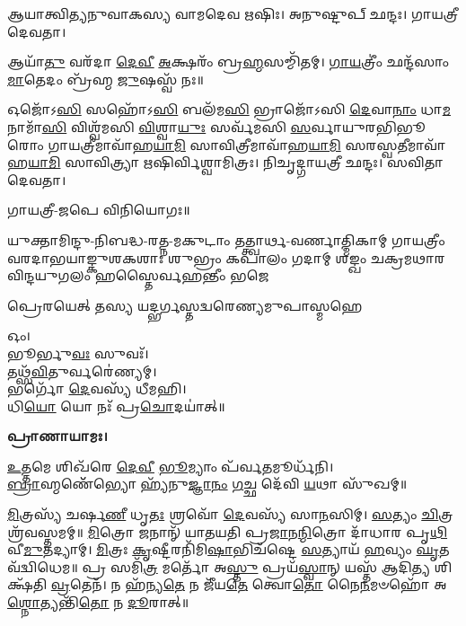𑌆𑌯𑌾𑌤𑍍𑌵𑌿𑌤𑍍𑌯𑌨𑍁𑌵𑌾𑌕𑌸𑍍𑌯 𑌵𑌾𑌮𑌦𑍇𑌵 𑌋𑌷𑌿𑌃।
𑌅𑌨𑍁𑌷𑍍𑌟𑍁𑌪𑍍 𑌛𑌨𑍍𑌦𑌃।
𑌗𑌾𑌯𑌤𑍍𑌰𑍀 𑌦𑍇𑌵𑌤𑌾।

𑌆𑌯𑌾᳴\-\ul{𑌤𑍁} 𑌵𑌰᳴𑌦𑌾 \ul{𑌦𑍇}\-\-\ul{𑌵𑍀} \ul{𑌅}\-𑌕𑍍𑌷𑌰𑌂᳴ 𑌬𑍍𑌰\-\ul{𑌹𑍍𑌮}\-𑌸𑌮𑍍𑌮𑌿᳴𑌤𑌮𑍍। \ul{𑌗𑌾}\-\-\ul{𑌯}\-𑌤𑍍𑌰𑍀𑌂॑ 𑌛𑌨𑍍𑌦᳴𑌸𑌾𑌂 \ul{𑌮𑌾}\-𑌤𑍇𑌦𑌂 𑌬𑍍𑌰᳴𑌹𑍍𑌮 \ul{𑌜𑍁}\-𑌷𑌸𑍍𑌵᳴ 𑌨𑌃॥

𑌓𑌜𑍋᳴𑌽\-\ul{𑌸𑌿} 𑌸𑌹𑍋᳴𑌽\-\ul{𑌸𑌿} 𑌬𑌲᳴𑌮\-\ul{𑌸𑌿} 𑌭𑍍𑌰𑌾𑌜𑍋᳴𑌽𑌸𑌿 \ul{𑌦𑍇}\-𑌵𑌾\-\ul{𑌨𑌾𑌂} 𑌧𑌾\-\ul{𑌮} 𑌨𑌾𑌮𑌾᳴\-\ul{𑌸𑌿} 𑌵𑌿𑌶𑍍𑌵᳴𑌮𑌸𑌿 \ul{𑌵𑌿}\-𑌶𑍍𑌵𑌾\-\ul{𑌯𑍁𑌃} 𑌸𑌰𑍍𑌵᳴𑌮𑌸𑌿 \ul{𑌸}\-𑌰𑍍𑌵𑌾𑌯𑍁𑌰𑌭𑌿𑌭𑍂𑌰𑍋𑌂 𑌗𑌾𑌯𑌤𑍍𑌰𑍀𑌮𑌾𑌵𑌾᳴𑌹\-\ul{𑌯𑌾}\-\-\ul{𑌮𑌿} 𑌸𑌾𑌵𑌿𑌤𑍍𑌰𑍀𑌮𑌾𑌵𑌾᳴𑌹\-\ul{𑌯𑌾}\-\-\ul{𑌮𑌿} 𑌸𑌰𑌸𑍍𑌵𑌤𑍀𑌮𑌾𑌵𑌾᳴𑌹\-\-\ul{𑌯𑌾}\-\-\ul{𑌮𑌿} 𑌸𑌾𑌵𑌿𑌤𑍍𑌰𑍍𑌯𑌾 𑌋𑌷𑌿𑌰𑍍𑌵𑌿𑌶𑍍𑌵𑌾𑌮𑌿𑌤𑍍𑌰𑌃। 𑌨𑌿𑌚𑍃𑌦𑍍𑌗𑌾𑌯𑌤𑍍𑌰𑍀 𑌛𑌨𑍍𑌦𑌃। 𑌸𑌵𑌿𑌤𑌾 𑌦𑍇𑌵𑌤𑌾।

𑌗𑌾𑌯𑌤𑍍𑌰𑍀-𑌜𑌪𑍇 𑌵𑌿𑌨𑌿𑌯𑍋𑌗𑌃॥



{𑌯𑍁𑌕𑍍𑌤𑌾𑌮𑌿𑌨𑍍𑌦𑍁-𑌨𑌿𑌬𑌦𑍍𑌧-𑌰𑌤𑍍𑌨-𑌮𑌕𑍁𑌟𑌾𑌂 𑌤𑌤𑍍𑌤𑍍𑌵𑌾𑌰𑍍𑌥-𑌵𑌰𑍍𑌣𑌾𑌤𑍍𑌮𑌿𑌕𑌾𑌮𑍍}
{𑌗𑌾𑌯𑌤𑍍𑌰𑍀𑌂 𑌵𑌰𑌦𑌾𑌭𑌯𑌾𑌙𑍍𑌕𑍁𑌶𑌕𑌶𑌾𑌃 𑌶𑍁𑌭𑍍𑌰𑌂 𑌕𑌪𑌾𑌲𑌂 𑌗𑌦𑌾𑌮𑍍}
{𑌶𑌙𑍍𑌖𑌂 𑌚𑌕𑍍𑌰𑌮𑌥𑌾𑌰𑌵𑌿𑌨𑍍𑌦𑌯𑍁𑌗𑌲𑌂 𑌹𑌸𑍍𑌤𑍈𑌰𑍍𑌵𑌹𑌨𑍍𑌤𑍀𑌂 𑌭𑌜𑍇}

{𑌪𑍍𑌰𑍇𑌰𑌯𑍇𑌤𑍍 𑌤𑌸𑍍𑌯 𑌯𑌦𑍍𑌭𑌰𑍍𑌗𑌸𑍍𑌤𑌦𑍍𑌵𑌰𑍇𑌣𑍍𑌯𑌮𑍁𑌪𑌾𑌸𑍍𑌮𑌹𑍇}


𑌓𑌂।\\
𑌭𑍂𑌰𑍍𑌭𑍁\-\ul{𑌵𑌃} 𑌸𑍁𑌵𑌃᳴।\\
𑌤𑌥𑍍𑌸᳴\-\ul{𑌵𑌿}\-𑌤𑍁𑌰𑍍𑌵𑌰𑍇॑𑌣𑍍𑌯𑌮𑍍।\\
𑌭𑌰𑍍𑌗𑍋᳴ \ul{𑌦𑍇}\-𑌵𑌸𑍍𑌯᳴ 𑌧𑍀𑌮𑌹𑌿।\\
𑌧𑌿\-\ul{𑌯𑍋} 𑌯𑍋 𑌨𑌃᳴ 𑌪𑍍𑌰\-\ul{𑌚𑍋}\-𑌦𑌯𑌾॑𑌤𑍍॥

\textbf{𑌪𑍍𑌰𑌾𑌣𑌾𑌯𑌾𑌮𑌃।}


\-\ul{𑌉}\-𑌤𑍍𑌤𑌮𑍇 𑌶𑌿𑌖᳴𑌰𑍇 \ul{𑌦𑍇}\-\-\ul{𑌵𑍀} \ul{𑌭𑍂}\-𑌮𑍍𑌯𑌾𑌂 𑌪᳴𑌰𑍍𑌵\-\ul{𑌤}\-𑌮𑍂𑌰𑍍𑌧᳴𑌨𑌿।\\
\-\ul{𑌬𑍍𑌰𑌾}\-𑌹𑍍𑌮𑌣𑍇᳴᳴𑌭𑍍𑌯𑍋 𑌹𑍍𑌯᳴𑌨𑍁\-\ul{𑌜𑍍𑌞𑌾}\-\-\ul{𑌨𑌂} \ul{𑌗}\-𑌚𑍍𑌛 𑌦𑍇᳴𑌵𑌿 \ul{𑌯}\-𑌥𑌾 𑌸𑍁᳴𑌖𑌮𑍍॥


\-\ul{𑌮𑌿}\-𑌤𑍍𑌰𑌸𑍍𑌯᳴ 𑌚𑌰𑍍\mbox{}𑌷\-\ul{𑌣𑍀} 𑌧𑍃\-\ul{𑌤𑌃} 𑌶𑍍𑌰𑌵𑍋᳴ \ul{𑌦𑍇}\-𑌵𑌸𑍍𑌯᳴ 𑌸𑌾\-\ul{𑌨}\-𑌸𑌿𑌮𑍍। \ul{𑌸}\-𑌤𑍍𑌯𑌂 \ul{𑌚𑌿}\-𑌤𑍍𑌰𑌶𑍍𑌰᳴𑌵𑌸𑍍𑌤𑌮𑌮𑍍॥ \ul{𑌮𑌿}\-𑌤𑍍𑌰𑍋 𑌜𑌨𑌾𑌨𑍍᳴ 𑌯𑌾𑌤𑌯𑌤𑌿 𑌪𑍍𑌰\-\ul{𑌜𑌾}\-𑌨\-\ul{𑌨𑍍𑌮𑌿}\-𑌤𑍍𑌰𑍋 𑌦𑌾᳴𑌧𑌾𑌰 𑌪𑍃\-\ul{𑌥𑌿}\-𑌵𑍀\-\ul{𑌮𑍁}\-𑌤𑌦𑍍𑌯𑌾𑌮𑍍। \ul{𑌮𑌿}\-𑌤𑍍𑌰𑌃 \ul{𑌕𑍃}\-𑌷𑍍𑌟𑍀𑌰𑌨𑌿᳴𑌮𑌿\-\ul{𑌷𑌾}\-𑌭𑌿𑌚᳴𑌷𑍍𑌟𑍇 \ul{𑌸}\-𑌤𑍍𑌯𑌾𑌯᳴ \ul{𑌹}\-𑌵𑍍𑌯𑌂 \ul{𑌘𑍃}\-𑌤𑌵᳴𑌦𑍍𑌵𑌿𑌧𑍇𑌮॥ 𑌪𑍍𑌰 𑌸𑌮𑌿᳴\-\ul{𑌤𑍍𑌰} 𑌮𑌰𑍍𑌤𑍋᳴ 𑌅\-\ul{𑌸𑍍𑌤𑍁} 𑌪𑍍𑌰𑌯᳴\-\ul{𑌸𑍍𑌵𑌾}\-𑌨𑍍 𑌯𑌸𑍍𑌤᳴ 𑌆𑌦𑌿\-\ul{𑌤𑍍𑌯} 𑌶𑌿𑌕𑍍𑌷᳴𑌤𑌿 \ul{𑌵𑍍𑌰}\-𑌤𑍇𑌨᳴। 𑌨 𑌹᳴𑌨𑍍𑌯\-\ul{𑌤𑍇} 𑌨 𑌜𑍀᳴𑌯\-\ul{𑌤𑍇} 𑌤𑍍𑌵𑍋\-\ul{𑌤𑍋} 𑌨𑍈\-\ul{𑌨}\-𑌮𑍞𑌹𑍋᳴ 𑌅\-\ul{𑌶𑍍𑌨𑍋}\-𑌤𑍍𑌯𑌨𑍍𑌤𑌿᳴\-\ul{𑌤𑍋} 𑌨 \ul{𑌦𑍂}\-𑌰𑌾𑌤𑍍॥


